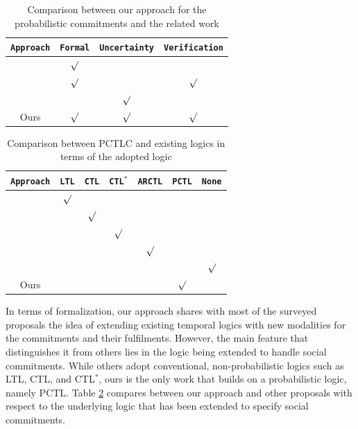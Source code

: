 \begin{table}
\centering \caption{Comparison between our approach for the probabilistic commitments and the related work} \label{table:comparison1}
\begin{tabular}{|c|c|c|c|}
\hline
\texttt{Approach}       & \texttt{Formal}   & \texttt{Uncertainty} & \texttt{Verification}\\
\hline
\hline
\cite{Bentahar2004,Bentahar2007,Singh2000}       & $\surd$         &   & \\
\hline
\cite{Bentahar2012,Cheng2006,Desai2007,El-Menshawy2010,El-Menshawy2011b,El-Menshawy2013a,El-Menshawy2013b,El-Menshawy2011a,Gerard2013,Telang2012}      & $\surd$         &   &$\surd$ \\
\hline
\cite{Witwicki2007,Witwicki2009}      &          &$\surd$   & \\
\hline
Ours                     &$\surd$   &$\surd$  &$\surd$    \\
\hline

\end{tabular}
\end{table}
\begin{table}
\centering \caption{Comparison between PCTLC and existing logics in terms of the adopted logic} \label{table:comparison2}
\begin{tabular}{|c|c|c|c|c|c|c|}
\hline
\texttt{Approach}       & \texttt{LTL}   & \texttt{CTL} & \texttt{CTL$^*$} & \texttt{ARCTL}     & \texttt{PCTL} &\texttt{None}\\
\hline
\hline
\cite{Cheng2006,Desai2007}    &$\surd$          & & & & &\\
\hline
\cite{Bentahar2012,El-Menshawy2011b,El-Menshawy2013a,El-Menshawy2011a,Gerard2013,Singh2000,Telang2012}       &          &$\surd$  && && \\
\hline
\cite{Bentahar2004,Bentahar2007,El-Menshawy2010}  &          &  &$\surd$ & &&\\
\hline
\cite{El-Menshawy2013b}      &          & &  &$\surd$ &&\\
\hline
\cite{Witwicki2007,Witwicki2009}      &      &    &   && &$\surd$\\
\hline
Ours                     &   &  & & &$\surd$ & \\
\hline


\end{tabular}
\end{table}

In terms of formalization, our approach shares with most of the
surveyed proposals the idea of extending existing temporal logics
with new modalities for the commitments and their fulfilments.
However, the main feature that distinguishes it from others lies
in the logic being extended to handle social commitments. While
others adopt conventional, non-probabilistic logics such as LTL,
CTL, and CTL$^*$, ours is the only work that builds on a
probabilistic logic, namely PCTL. Table \ref{table:comparison2}
compares between our approach and other proposals with respect to
the underlying logic that has been extended to specify social
commitments.

